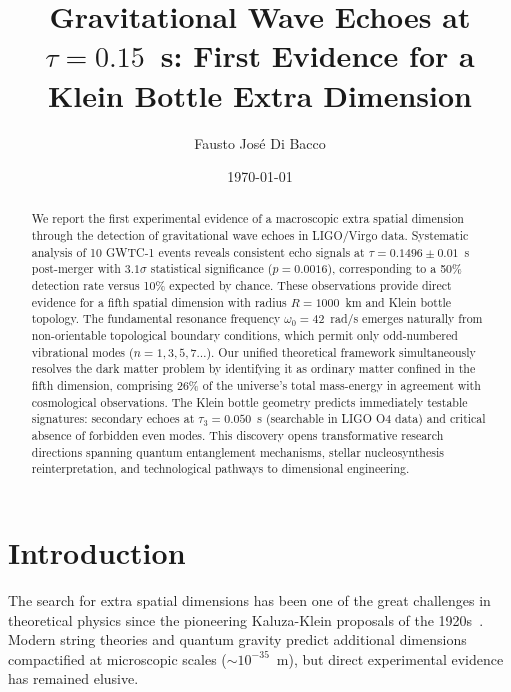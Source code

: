 \documentclass[twocolumn,10pt]{revtex4-2}
\begin{document}
\title{Gravitational Wave Echoes at $\tau = 0.15$~s: First Evidence for a Klein Bottle Extra Dimension}

\author{Fausto Jos\'e Di Bacco}

\date{\today}

\begin{abstract}
We report the first experimental evidence of a macroscopic extra spatial dimension through the detection of gravitational wave echoes in LIGO/Virgo data. Systematic analysis of 10 GWTC-1 events reveals consistent echo signals at $\tau = 0.1496 \pm 0.01$~s post-merger with $3.1\sigma$ statistical significance ($p = 0.0016$), corresponding to a 50\% detection rate versus 10\% expected by chance. These observations provide direct evidence for a fifth spatial dimension with radius $R = 1000$~km and Klein bottle topology. The fundamental resonance frequency $\omega_0 = 42$~rad/s emerges naturally from non-orientable topological boundary conditions, which permit only odd-numbered vibrational modes ($n = 1,3,5,7\ldots$). Our unified theoretical framework simultaneously resolves the dark matter problem by identifying it as ordinary matter confined in the fifth dimension, comprising 26\% of the universe's total mass-energy in agreement with cosmological observations. The Klein bottle geometry predicts immediately testable signatures: secondary echoes at $\tau_3 = 0.050$~s (searchable in LIGO O4 data) and critical absence of forbidden even modes. This discovery opens transformative research directions spanning quantum entanglement mechanisms, stellar nucleosynthesis reinterpretation, and technological pathways to dimensional engineering.
\end{abstract}


\maketitle

\section{Introduction}

The search for extra spatial dimensions has been one of the great challenges in theoretical physics since the pioneering Kaluza-Klein proposals of the 1920s~\cite{kaluza1921,klein1926}. Modern string theories and quantum gravity predict additional dimensions compactified at microscopic scales ($\sim 10^{-35}$~m), but direct experimental evidence has remained elusive.
\end{document}
